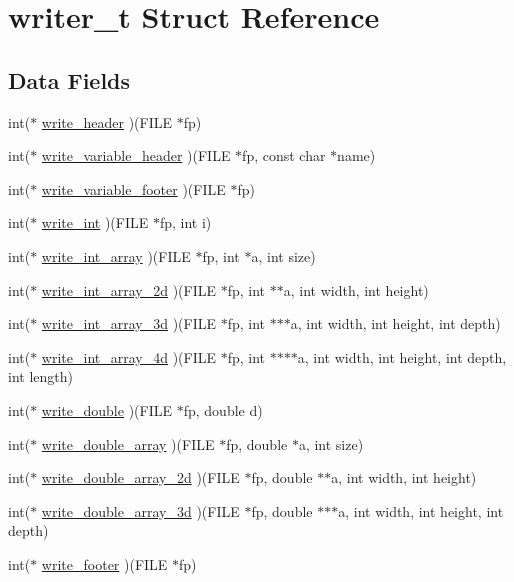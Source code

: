 \hypertarget{structwriter__t}{}\section{writer\+\_\+t Struct Reference}
\label{structwriter__t}
\subsection*{Data Fields}
\begin{DoxyCompactItemize}
\item 
int($\ast$ \hyperlink{structwriter__t_a589ac59557ca8095d3d1c87cbf7f2538}{write\+\_\+header} )(F\+I\+LE $\ast$fp)
\item 
int($\ast$ \hyperlink{structwriter__t_a1ab7bd7ba5e613d693b63101f690b2f7}{write\+\_\+variable\+\_\+header} )(F\+I\+LE $\ast$fp, const char $\ast$name)
\item 
int($\ast$ \hyperlink{structwriter__t_afd5340cc6c2116fda29a70332fe765f4}{write\+\_\+variable\+\_\+footer} )(F\+I\+LE $\ast$fp)
\item 
int($\ast$ \hyperlink{structwriter__t_a689a36091a9036a26b8559081afeb675}{write\+\_\+int} )(F\+I\+LE $\ast$fp, int i)
\item 
int($\ast$ \hyperlink{structwriter__t_a3e0f5204d947a6e79652eed3cb50e320}{write\+\_\+int\+\_\+array} )(F\+I\+LE $\ast$fp, int $\ast$a, int size)
\item 
int($\ast$ \hyperlink{structwriter__t_a70bc983d3bb23234726a11eaae17a3fa}{write\+\_\+int\+\_\+array\+\_\+2d} )(F\+I\+LE $\ast$fp, int $\ast$$\ast$a, int width, int height)
\item 
int($\ast$ \hyperlink{structwriter__t_a6c3b911dd02e131c7e995c013ab4bf99}{write\+\_\+int\+\_\+array\+\_\+3d} )(F\+I\+LE $\ast$fp, int $\ast$$\ast$$\ast$a, int width, int height, int depth)
\item 
int($\ast$ \hyperlink{structwriter__t_a60f59670eb1829ef88ff94de402685f8}{write\+\_\+int\+\_\+array\+\_\+4d} )(F\+I\+LE $\ast$fp, int $\ast$$\ast$$\ast$$\ast$a, int width, int height, int depth, int length)
\item 
int($\ast$ \hyperlink{structwriter__t_a2e23cf6a55fd230fab640de4a5e642dd}{write\+\_\+double} )(F\+I\+LE $\ast$fp, double d)
\item 
int($\ast$ \hyperlink{structwriter__t_ad32d593b6849dc3e337fe9247e079fa2}{write\+\_\+double\+\_\+array} )(F\+I\+LE $\ast$fp, double $\ast$a, int size)
\item 
int($\ast$ \hyperlink{structwriter__t_a98962d6be6e2fc295f83e6605273a49c}{write\+\_\+double\+\_\+array\+\_\+2d} )(F\+I\+LE $\ast$fp, double $\ast$$\ast$a, int width, int height)
\item 
int($\ast$ \hyperlink{structwriter__t_ac032437b1c445034b62ed0e94ad14825}{write\+\_\+double\+\_\+array\+\_\+3d} )(F\+I\+LE $\ast$fp, double $\ast$$\ast$$\ast$a, int width, int height, int depth)
\item 
int($\ast$ \hyperlink{structwriter__t_a2f47df34e4cd72fa49d7b7a2a1bc7f15}{write\+\_\+footer} )(F\+I\+LE $\ast$fp)
\end{DoxyCompactItemize}


